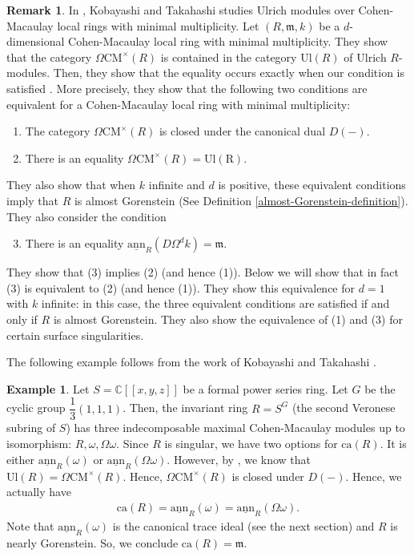 \documentclass[12pt]{amsart}
\newcommand{\sann}{\underline{\mathrm{ann}}}
\newcommand\ca{\mathrm{ca}}
\newcommand{\m}{\mathfrak{m}}
\newcommand{\CM}{\mathrm{CM}}
\newcommand{\CC}{\mathcal{C}}
\theoremstyle{definition}
\newtheorem{example}[theorem]{Example}
\newtheorem{remark}[theorem]{Remark}
\numberwithin{equation}{theorem}
\def\CC{\mathbb{C}}
\begin{document}
\begin{remark}\label{Kobayashi-Takahashi-remark}
    In \cite{Kobayashi-Takahashi}, Kobayashi and Takahashi studies Ulrich modules over Cohen-Macaulay local rings with minimal multiplicity. Let $(R, \m, k)$ be a $d$-dimensional Cohen-Macaulay local ring with minimal multiplicity. They show that the category $\Omega \CM^{\times}(R)$ is contained in the category $\mathrm{Ul}(R)$ of Ulrich $R$-modules. Then, they show that the equality occurs exactly when our condition is satisfied \cite[Theorem B]{Kobayashi-Takahashi}. More precisely, they show that the following two conditions are equivalent for a Cohen-Macaulay local ring with minimal multiplicity: 
    \begin{enumerate}
        \item The category $\Omega \CM^\times(R)$ is closed under the canonical dual $D(-)$.
        \item There is an equality $\Omega \CM^\times (R) = \mathrm{Ul(R)}$.   
    \end{enumerate}
    They also show that when $k$ infinite and $d$ is positive, these equivalent conditions imply that $R$ is almost Gorenstein (See Definition \ref{almost-Gorenstein-definition}). They also consider the condition 
    \begin{enumerate}
        \setcounter{enumi}{2}
        \item There is an equality $\sann_R(D\Omega^d k) = \m$. 
    \end{enumerate}
    They show that (3) implies (2) (and hence (1)). Below we will show that in fact (3) is equivalent to (2) (and hence (1)). They show this equivalence for $d=1$ with $k$ infinite: in this case, the three equivalent conditions are satisfied if and only if $R$ is almost Gorenstein. They also show the equivalence of (1) and (3) for certain surface singularities.
\end{remark}
The following example follows from the work of Kobayashi and Takahashi \cite[Example 3.12]{Kobayashi-Takahashi}.
\begin{example}
    Let $S = \CC[[x,y,z]]$ be a formal power series ring. Let $G$ be the cyclic group $\dfrac{1}{3}(1,1,1)$. Then, the invariant ring $R = S^G$ (the second Veronese subring of $S$) has three indecomposable maximal Cohen-Macaulay modules up to isomorphism: $R, \omega, \Omega \omega$. Since $R$ is singular, we have two options for $\ca(R)$. It is either $\sann_R(\omega)$ or $\sann_R(\Omega \omega)$. However, by \cite[Example 3.12]{Kobayashi-Takahashi}, we know that $\mathrm{Ul}(R) = \Omega \CM^\times(R)$. Hence, $\Omega \CM^\times(R)$ is closed under $D(-)$. Hence, we actually have 
    \begin{align*}
        \ca(R) = \sann_R(\omega) = \sann_R(\Omega \omega).
    \end{align*}        
    Note that $\sann_R(\omega)$ is the canonical trace ideal (see the next section) and $R$ is nearly Gorenstein. So, we conclude $\ca(R) = \m$.
\end{example}
\end{document}
